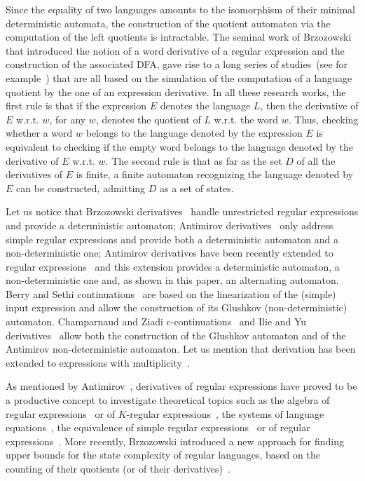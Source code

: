 \documentclass{article}
\begin{document}
Since the equality of two languages amounts to 
the isomorphism of their minimal deterministic automata, 
the construction of the quotient automaton via the computation of the left quotients is intractable.
The seminal work of Brzozowski~\cite{Brz64}
that introduced the notion of a word derivative of a regular expression
and the construction of the associated DFA,
gave rise to a long series of studies~(see for example~\cite{BS86,Ant96,CZ01c,IY03,CCM11b}) 
that are all based on 
the simulation of the computation of a language 
quotient
by the one of an expression derivative.
In all these research works, the first rule is that if the expression $E$ denotes the language $L$,
then the derivative of $E$ w.r.t. $w$, for any $w$, denotes the quotient of $L$ w.r.t. the word $w$.
Thus, checking whether a word $w$ belongs to the language denoted by the expression $E$  is equivalent to 
checking if the empty word belongs to the language denoted by the derivative of $E$ w.r.t. $w$.
The second rule is that as far as the set $D$ of all the derivatives of $E$ is finite,
a finite automaton recognizing the language denoted by $E$ can be constructed,
admitting $D$ as a set of states.

Let us notice 
that Brzozowski derivatives~\cite{Brz64} handle 
unrestricted regular expressions and provide a deterministic automaton;
Antimirov derivatives~\cite{Ant96} only address simple regular expressions 
and provide both a deterministic automaton and a non-deterministic one;
Antimirov derivatives have been recently extended to 
regular expressions~\cite{CCM11b} and this extension
provides a deterministic automaton, a non-deterministic one
and, as shown in this paper, an alternating automaton.
Berry and Sethi continuations~\cite{BS86} are based on the linearization of the (simple) input expression
and allow the construction of its Glushkov (non-deterministic) automaton.
Champarnaud and Ziadi c-continuations~\cite{CZ01c} and Ilie and Yu derivatives~\cite{IY03}
allow both the construction of the Glushkov automaton and of the Antimirov non-deterministic automaton.
Let us mention that derivation has been extended to expressions with multiplicity~\cite{LS01,COZ09}. 
 
As mentioned by Antimirov~\cite{Ant96},
derivatives of regular expressions have proved to be a productive concept to investigate theoretical topics such as
the algebra of regular expressions~\cite{Con71} or
of $K$-regular expressions~\cite{Kro92},
the systems of language equations~\cite{BL80},
the equivalence of simple regular expressions~\cite{Gin67} or of regular expressions~\cite{AM95}.
More recently, Brzozowski introduced a new approach for finding upper bounds
for the state complexity of regular languages,
based on the counting of their quotients (or of their derivatives)~\cite{Brz10}.
\end{document}
